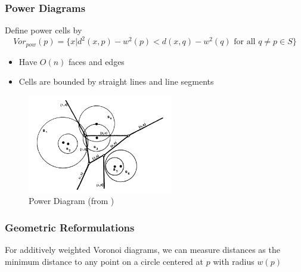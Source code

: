 \documentclass{beamer}
\begin{document}
\begin{frame}
  \frametitle{Power Diagrams}

  Define power cells by
  \[ Vor_{pow}(p) = \{ x | d^2(x,p) - w^2(p) < d(x,q) - w^2(q) \text{ for all } q \neq p \in S \} \]

  \begin{itemize}
    \item Have $O(n)$ faces and edges
    \item Cells are bounded by straight lines and line segments
  \end{itemize}

  \begin{figure}
    \includegraphics[width=2.5in]{power(aur_pow).png}
    \caption{Power Diagram (from \cite{aurenhammer_power})}
  \end{figure}

\end{frame}

\begin{frame}
  \frametitle{Geometric Reformulations}

  \begin{figure}

  \end{figure}

  For additively weighted Voronoi diagrams, we can measure distances as the minimum distance to any point on a circle centered at $p$ with radius
  $w(p)$ \cite{rosenberger_additive}

\end{frame}
\end{document}
